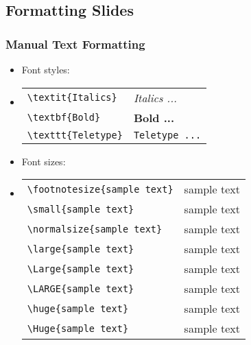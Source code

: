 %
%
%
%

\subsection{Formatting Slides}

\begin{slide}
  \frametitle{Manual Text Formatting}
  \begin{itemize}
    \item Font styles:
    \item[]
      \begin{tabular}{l | l}
        \footnotesize{\texttt{\textbackslash textit\{Italics\} }} & \textit{Italics ...}  \\
        \footnotesize{\texttt{\textbackslash textbf\{Bold\}    }} & \textbf{Bold ...}     \\
        \footnotesize{\texttt{\textbackslash texttt\{Teletype\}}} & \texttt{Teletype ...} \\
      \end{tabular}
    \item Font sizes:
    \item[]
      \begin{tabular}{l | c}
        \footnotesize{\texttt{\textbackslash footnotesize\{sample text\}}} & \footnotesize{sample text} \\
        \footnotesize{\texttt{\textbackslash small\{sample text\}       }} & \small{sample text}        \\
        \footnotesize{\texttt{\textbackslash normalsize\{sample text\}  }} & \normalsize{sample text}   \\
        \footnotesize{\texttt{\textbackslash large\{sample text\}       }} & \large{sample text}        \\
        \footnotesize{\texttt{\textbackslash Large\{sample text\}       }} & \Large{sample text}        \\
        \footnotesize{\texttt{\textbackslash LARGE\{sample text\}       }} & \LARGE{sample text}        \\
        \footnotesize{\texttt{\textbackslash huge\{sample text\}        }} & \huge{sample text}         \\
        \footnotesize{\texttt{\textbackslash Huge\{sample text\}        }} & \Huge{sample text}         \\
      \end{tabular}
  \end{itemize}
\end{slide}


